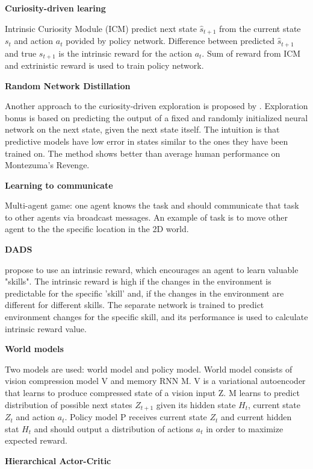\documentclass{article}
\begin{document}
\textbf{Curiosity-driven learing}~\citep{Pathak2017CuriosityDrivenEB}

Intrinsic Curiosity Module (ICM) predict next state $\hat{s}_{t+1}$ from the current state $s_t$ and action $a_t$ povided by policy network. Difference between predicted $\hat{s}_{t+1}$ and true $s_{t+1}$ is the intrinsic reward for the action $a_t$. Sum of reward from ICM and extrinistic reward is used to train policy network.

\textbf{Random Network Distillation}

Another approach to the curiosity-driven exploration is proposed by \citep{Burda2019ExplorationBR}. Exploration bonus is based on predicting the output of a fixed and randomly initialized neural network on the next state, given the next state itself. The intuition is that predictive models have low error in states similar to the ones they have been trained on. The method shows better than average human performance on Montezuma’s Revenge.

\textbf{Learning to communicate}~\citep{Mordatch2018EmergenceOG}

Multi-agent game: one agent knows the task and should communicate that task to other agents via broadcast messages. An example of task is to move other agent to the the specific location in the 2D world.

\textbf{DADS}

\citep{Sharma2020DynamicsAwareUD} propose to use an intrinsic reward, which encourages an agent to learn valuable "skills". The intrinsic reward is high if the changes in the environment is predictable for the specific 'skill' and, if the changes in the environment are different for different skills. The separate network is trained to predict environment changes for the specific skill, and its performance is used to calculate intrinsic reward value.

\textbf{World models}~\citep{Ha2018RecurrentWM}

Two models are used: world model and policy model. World model consists of vision compression model V and memory RNN M. V is a variational autoencoder that learns to produce compressed state of a vision input Z. M learns to predict distribution of possible next states $Z_{t+1}$ given its hidden state $H_t$, current state $Z_t$ and action $a_t$. Policy model P receives current state $Z_t$ and current hidden stat $H_t$ and should output a distribution of actions $a_t$ in order to maximize expected reward.

\textbf{Hierarchical Actor-Critic}~\citep{levy2017learning}
\end{document}
